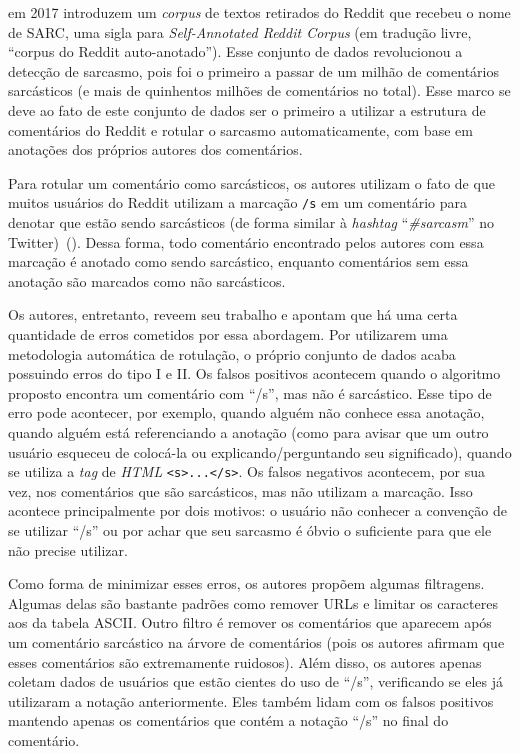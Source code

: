 \cite{khodak-etal:2017:sarc} em 2017 introduzem um \textit{corpus} de textos
retirados do Reddit que recebeu o nome de SARC, uma sigla para
\textit{Self-Annotated Reddit Corpus} (em tradução livre, ``corpus do Reddit
auto-anotado''). Esse conjunto de dados revolucionou a detecção de sarcasmo,
pois foi o primeiro a passar de um milhão de comentários sarcásticos (e mais de
quinhentos milhões de comentários no total). Esse marco se deve ao fato de este
conjunto de dados ser o primeiro a utilizar a estrutura de comentários do Reddit
e rotular o sarcasmo automaticamente, com base em anotações dos próprios autores
dos comentários.

Para rotular um comentário como sarcásticos, os autores utilizam o fato de que
muitos usuários do Reddit utilizam a marcação \texttt{/s} em um comentário para
denotar que estão sendo sarcásticos (de forma similar à \textit{hashtag}
``\textit{\#sarcasm}'' no Twitter)~(\cite{what-does-s-mean}). Dessa forma, todo
comentário encontrado pelos autores com essa marcação é anotado como sendo
sarcástico, enquanto comentários sem essa anotação são marcados como não
sarcásticos.

Os autores, entretanto, reveem seu trabalho e apontam que há uma certa
quantidade de erros cometidos por essa abordagem. Por utilizarem uma metodologia
automática de rotulação, o próprio conjunto de dados acaba possuindo erros do
tipo I e II. Os falsos positivos acontecem quando o algoritmo proposto encontra
um comentário com ``/s'', mas não é sarcástico. Esse tipo de erro pode
acontecer, por exemplo, quando alguém não conhece essa anotação, quando alguém
está referenciando a anotação (como para avisar que um outro usuário esqueceu de
colocá-la ou explicando/perguntando seu significado), quando se utiliza a
\textit{tag} de \textit{HTML} \texttt{<s>...</s>}. Os falsos negativos
acontecem, por sua vez, nos comentários que são sarcásticos, mas não utilizam a
marcação. Isso acontece principalmente por dois motivos: o usuário não conhecer
a convenção de se utilizar ``/s'' ou por achar que seu sarcasmo é óbvio o
suficiente para que ele não precise utilizar.

Como forma de minimizar esses erros, os autores propõem algumas filtragens.
Algumas delas são bastante padrões como remover URLs e limitar os caracteres aos
da tabela ASCII. Outro filtro é remover os comentários que aparecem após um
comentário sarcástico na árvore de comentários (pois os autores afirmam que
esses comentários são extremamente ruidosos). Além disso, os autores apenas
coletam dados de usuários que estão cientes do uso de ``/s'', verificando se
eles já utilizaram a notação anteriormente. Eles também lidam com os falsos
positivos mantendo apenas os comentários que contém a notação ``/s'' no final do
comentário.

